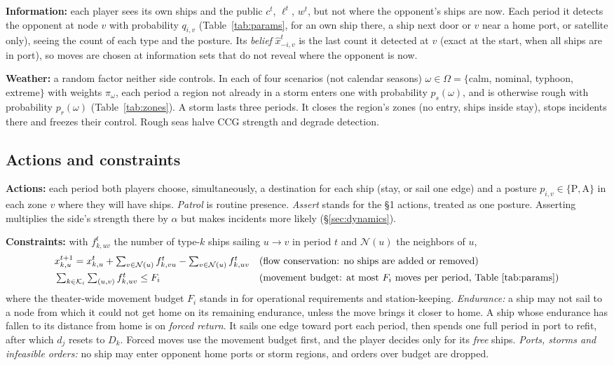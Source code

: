 \documentclass[10pt]{article}
\newcommand{\K}{\mathcal{K}}
\newcommand{\1}{\mathbf{1}}
\newcommand{\As}{\mathrm{A}}
\newcommand{\Pt}{\mathrm{P}}
\begin{document}
\textbf{Information:} each player sees its own ships and the public $c^t$, $\ell^t$, $w^t$, but not where the
opponent's ships are now. Each period it detects the opponent at node $v$ with probability $q_{i,v}$
(Table~\ref{tab:params}, for an own ship there, a ship next door or $v$ near a home port, or satellite only), seeing the count
of each type and the posture. Its \emph{belief} $\hat x^t_{-i,v}$ is the last count it detected at $v$ (exact at
the start, when all ships are in port), so moves are chosen at information sets that do not reveal where the opponent is now.

\textbf{Weather:} a random factor neither side controls. In each of four scenarios (not calendar seasons)
$\omega\in\Omega=\{$calm, nominal, typhoon, extreme$\}$ with weights $\pi_\omega$, each period a region
not already in a storm enters one with probability $p_s(\omega)$, and is otherwise rough with probability
$p_r(\omega)$ (Table~\ref{tab:zones}). A storm lasts three periods. It closes the region's zones (no entry, ships
inside stay), stops incidents there and freezes their control. Rough seas halve CCG strength and degrade detection.

\subsection{Actions and constraints}\label{sec:actions}
\textbf{Actions:} each period both players choose, simultaneously, a destination for each ship (stay, or sail one
edge) and a posture $p_{i,v}\in\{\Pt,\As\}$ in each zone $v$ where they will have ships. \emph{Patrol} is routine
presence. \emph{Assert} stands for the \S1 actions, treated as one posture. Asserting multiplies the side's strength
there by $\alpha$ but makes incidents more likely (\S\ref{sec:dynamics}).

\textbf{Constraints:} with $f^t_{k,uv}$ the number of type-$k$ ships sailing $u\to v$ in period $t$ and $\mathcal N(u)$ the neighbors of $u$,
\begin{align*}
&x^{t+1}_{k,u}=x^t_{k,u}+\textstyle\sum_{v\in\mathcal N(u)}f^t_{k,vu}-\sum_{v\in\mathcal N(u)}f^t_{k,uv}
&&\text{(flow conservation: no ships are added or removed)}\\
&\textstyle\sum_{k\in\K_i}\sum_{(u,v)}f^t_{k,uv}\le F_i
&&\text{(movement budget: at most $F_i$ moves per period, Table~\ref{tab:params})}
\end{align*}
where the theater-wide movement budget $F_i$ stands in for operational requirements and station-keeping.
\emph{Endurance:} a ship may not sail to a node from which it could not get home on its remaining endurance,
unless the move brings it closer to home. A ship whose endurance has fallen to its distance from home is on
\emph{forced return}. It sails one edge toward port each period, then spends one full period in port to refit,
after which $d_j$ resets to $D_k$. Forced moves use the movement budget first, and the player decides only for its
\emph{free} ships. \emph{Ports, storms and infeasible orders:} no ship may enter opponent home ports or storm
regions, and orders over budget are dropped.
\end{document}
